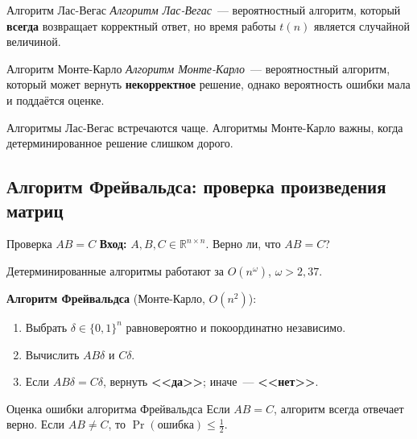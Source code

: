 \begin{Definition}{Алгоритм Лас-Вегас}{}
	\emph{Алгоритм Лас-Вегас}~--- вероятностный алгоритм, который \textbf{всегда} возвращает корректный ответ, но время работы $t(n)$ является случайной величиной.
\end{Definition}

\begin{Definition}{Алгоритм Монте-Карло}{}
	\emph{Алгоритм Монте-Карло}~--- вероятностный алгоритм, который может вернуть \textbf{некорректное} решение, однако вероятность ошибки мала и поддаётся оценке.
\end{Definition}

\begin{Remark}{}{}
	Алгоритмы Лас-Вегас встречаются чаще. Алгоритмы Монте-Карло важны, когда детерминированное решение слишком дорого.
\end{Remark}

\subsection{Алгоритм Фрейвальдса: проверка произведения матриц}

\begin{Example}{Проверка $AB = C$}{}
	\textbf{Вход:} $A, B, C \in \mathbb{R}^{n\times n}$. Верно ли, что $AB = C$?
	
	Детерминированные алгоритмы работают за $O(n^{\omega})$, $\omega > 2{,}37$.
	
	\textbf{Алгоритм Фрейвальдса} (Монте-Карло, $O(n^2)$):
	\begin{enumerate}
		\item Выбрать $\delta\in\{0,1\}^n$ равновероятно и покоординатно независимо.
		\item Вычислить $AB\delta$ и $C\delta$.
		\item Если $AB\delta = C\delta$, вернуть \textbf{<<да>>}; иначе~--- \textbf{<<нет>>}.
	\end{enumerate}
\end{Example}

\begin{Theorem}{Оценка ошибки алгоритма Фрейвальдса}{}
	Если $AB = C$, алгоритм всегда отвечает верно. Если $AB \neq C$, то $\Pr(\text{ошибка}) \leq \tfrac{1}{2}$.
\end{Theorem}

